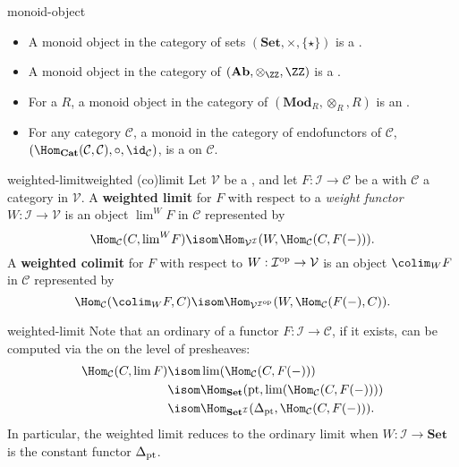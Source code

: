 \begin{example}{monoid-object}
    \begin{itemize}
        \item A monoid object in the category of sets $(\textbf{Set}, \times, \{ \star \})$ is a .
        \item A monoid object in the category of  $(\textbf{Ab}, \otimes_\ZZ, \ZZ)$ is a .
        \item For a  $R$, a monoid object in the category of  $(\textbf{Mod}_R, \otimes_R, R)$ is an .
        \item For any category $\mathcal{C}$, a monoid in the category of endofunctors of $\mathcal{C}$, $(\Hom_\textbf{Cat}(\mathcal{C}, \mathcal{C}), \circ, \id_\mathcal{C})$, is a  on $\mathcal{C}$.
    \end{itemize}
\end{example}

\begin{topic}{weighted-limit}{weighted (co)limit}
    Let $\mathcal{V}$ be a , and let $F : \mathcal{I} \to \mathcal{C}$ be a  with $\mathcal{C}$ a category  in $\mathcal{V}$. A \textbf{weighted limit} for $F$ with respect to a \textit{weight functor} $W : \mathcal{I} \to \mathcal{V}$ is an object ${\lim}^W F$ in $\mathcal{C}$ represented by
    \[ \Hom_\mathcal{C}(C, {\lim}^W F) \isom \Hom_{\mathcal{V}^\mathcal{I}}(W, \Hom_\mathcal{C}(C, F(-))) . \]
    A \textbf{weighted colimit} for $F$ with respect to $W : \mathcal{I}^\textup{op} \to \mathcal{V}$ is an object ${\colim}_W F$ in $\mathcal{C}$ represented by
    \[ \Hom_\mathcal{C}({\colim}_W F, C) \isom \Hom_{\mathcal{V}^{\mathcal{I}^\textup{op}}}(W, \Hom_\mathcal{C}(F(-), C)) . \]
\end{topic}

\begin{example}{weighted-limit}
    Note that an ordinary  of a functor $F : \mathcal{I} \to \mathcal{C}$, if it exists, can be computed via the  on the level of presheaves:
    \[ \begin{aligned} \Hom_\mathcal{C}(C, \lim F) &\isom \lim (\Hom_\mathcal{C}(C, F(-))) \\ &\isom \Hom_\textbf{Set}(\textup{pt}, \lim (\Hom_\mathcal{C}(C, F(-)))) \\ &\isom \Hom_{\textbf{Set}^\mathcal{I}}(\Delta_{\textup{pt}}, \Hom_\mathcal{C}(C, F(-))) . \end{aligned} \]
    In particular, the weighted limit reduces to the ordinary limit when $W : \mathcal{I} \to \textbf{Set}$ is the constant functor $\Delta_\textup{pt}$.
\end{example}


